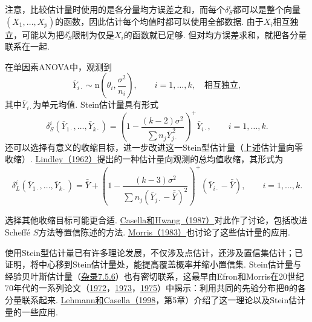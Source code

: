 注意，比较估计量时使用的是各分量均方误差之和，而每个$\delta_S^i$都可以是整个向量$(X_1,\ldots,X_p)$的函数，因此估计每个均值时都可以使用全部数据. 由于$X_i$相互独立，可能以为把$\delta_S^i$限制为仅是$X_i$的函数就已足够. 但对均方误差求和，就把各分量联系在一起.

在单因素ANOVA中，观测到
$$\bar Y_{i\cdot}\sim\mathrm n\left(\theta_i,\frac{\sigma^2}{n_i}\right),\qquad i=1,\ldots,k,\quad\text{相互独立},$$
其中$\bar Y_{i\cdot}$为单元均值. Stein估计量具有形式
$$\delta_S^i(\bar Y_{1\cdot},\ldots,\bar Y_{k\cdot})
=\left(1-\frac{(k-2)\sigma^2}{\sum n_j\bar Y_{j\cdot}^{\,2}}\right)^+\bar Y_{i\cdot},
\qquad i=1,\ldots,k.$$
还可以选择有意义的收缩目标，进一步改进这一Stein型估计量（上述估计量向零收缩\mbox{）.} \hyperref[bib:source205]{Lindley（1962）}提出的一种估计量向观测的总均值收缩，其形式为
$$\delta_L^i(\bar Y_{1\cdot},\ldots,\bar Y_{k\cdot})
=\bar{\bar Y}+\left(1-\frac{(k-3)\sigma^2}{\sum n_j(\bar Y_{j\cdot}-\bar{\bar Y})^2}\right)^+
(\bar Y_{i\cdot}-\bar{\bar Y}),\qquad i=1,\ldots,k.$$

选择其他收缩目标可能更合适. \hyperref[bib:source68]{Casella和Hwang（1987）}对此作了讨论，包括改进Scheff\'e $S$方法等置信陈述的方法. \hyperref[bib:source225]{Morris（1983）}也讨论了这些估计量的应用.

使用Stein型估计量已有许多理论发展，不仅涉及点估计，还涉及置信集估计；已证明，将中心移到Stein估计量处，能提高覆盖概率并缩小置信集. Stein估计量与经验贝叶斯估计量（\hyperref[sec:7.5.6]{杂录7.5.6}）也有密切联系，这最早由Efron和Morris在20世纪70年代的一系列论文（\hyperref[bib:source111]{1972}，\hyperref[bib:source112]{1973}，\hyperref[bib:source113]{1975}）中揭示：利用共同的先验分布把$\boldsymbol\theta$的各分量联系起来. \hyperref[bib:source200]{Lehmann和Casella（1998}，第5章）介绍了这一理论以及Stein估计量的一些应用.
